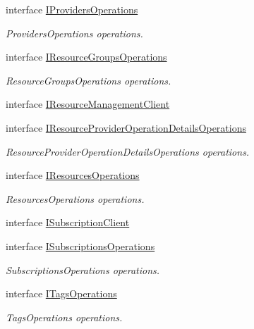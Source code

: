 \begin{DoxyCompactItemize}
interface \hyperlink{interface_microsoft_1_1_azure_1_1_management_1_1_resources_1_1_i_providers_operations}{I\+Providers\+Operations}
\begin{DoxyCompactList}\small\item\em Providers\+Operations operations. \end{DoxyCompactList}\item 
interface \hyperlink{interface_microsoft_1_1_azure_1_1_management_1_1_resources_1_1_i_resource_groups_operations}{I\+Resource\+Groups\+Operations}
\begin{DoxyCompactList}\small\item\em Resource\+Groups\+Operations operations. \end{DoxyCompactList}\item 
interface \hyperlink{interface_microsoft_1_1_azure_1_1_management_1_1_resources_1_1_i_resource_management_client}{I\+Resource\+Management\+Client}
\item 
interface \hyperlink{interface_microsoft_1_1_azure_1_1_management_1_1_resources_1_1_i_resource_provider_operation_details_operations}{I\+Resource\+Provider\+Operation\+Details\+Operations}
\begin{DoxyCompactList}\small\item\em Resource\+Provider\+Operation\+Details\+Operations operations. \end{DoxyCompactList}\item 
interface \hyperlink{interface_microsoft_1_1_azure_1_1_management_1_1_resources_1_1_i_resources_operations}{I\+Resources\+Operations}
\begin{DoxyCompactList}\small\item\em Resources\+Operations operations. \end{DoxyCompactList}\item 
interface \hyperlink{interface_microsoft_1_1_azure_1_1_management_1_1_resources_1_1_i_subscription_client}{I\+Subscription\+Client}
\item 
interface \hyperlink{interface_microsoft_1_1_azure_1_1_management_1_1_resources_1_1_i_subscriptions_operations}{I\+Subscriptions\+Operations}
\begin{DoxyCompactList}\small\item\em Subscriptions\+Operations operations. \end{DoxyCompactList}\item 
interface \hyperlink{interface_microsoft_1_1_azure_1_1_management_1_1_resources_1_1_i_tags_operations}{I\+Tags\+Operations}
\begin{DoxyCompactList}\small\item\em Tags\+Operations operations. \end{DoxyCompactList}\item 

\end{DoxyCompactItemize}
